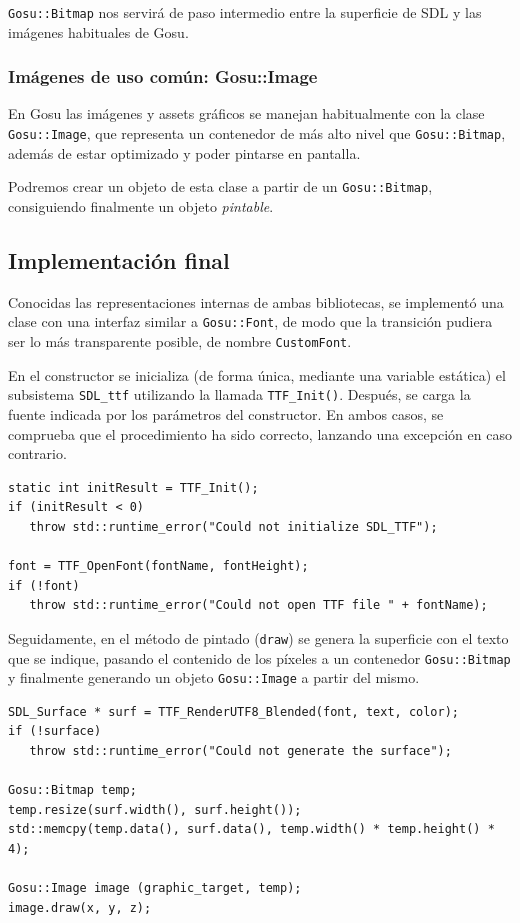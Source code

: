 \texttt{Gosu::Bitmap} nos servirá de paso intermedio entre la superficie de SDL y las
imágenes habituales de Gosu.

\subsubsection{Imágenes de uso común: Gosu::Image}
En Gosu las imágenes y assets gráficos se manejan habitualmente con la clase
\texttt{Gosu::Image}, que representa un contenedor de más alto nivel que
\texttt{Gosu::Bitmap}, además de estar optimizado y poder pintarse en pantalla.

Podremos crear un objeto de esta clase a partir de un \texttt{Gosu::Bitmap}, consiguiendo
finalmente un objeto \textit{pintable}.


\subsection{Implementación final}

Conocidas las representaciones internas de ambas bibliotecas, se implementó una
clase con una interfaz similar a \texttt{Gosu::Font}, de modo que la transición
pudiera ser lo más transparente posible, de nombre \texttt{CustomFont}.

En el constructor se inicializa (de forma única, mediante una variable estática)
el subsistema \texttt{SDL\_ttf} utilizando la llamada
\texttt{TTF\_Init()}. Después, se carga la fuente indicada por los parámetros
del constructor. En ambos casos, se comprueba que el procedimiento ha sido
correcto, lanzando una excepción en caso contrario.

\begin{verbatim}
static int initResult = TTF_Init();
if (initResult < 0)
   throw std::runtime_error("Could not initialize SDL_TTF");

font = TTF_OpenFont(fontName, fontHeight);
if (!font)
   throw std::runtime_error("Could not open TTF file " + fontName);

\end{verbatim}

Seguidamente, en el método de pintado (\texttt{draw}) se genera la superficie
con el texto que se indique, pasando el contenido de los píxeles a un contenedor
\texttt{Gosu::Bitmap} y finalmente generando un objeto \texttt{Gosu::Image} a
partir del mismo.

\begin{verbatim}
SDL_Surface * surf = TTF_RenderUTF8_Blended(font, text, color);
if (!surface)
   throw std::runtime_error("Could not generate the surface");

Gosu::Bitmap temp;
temp.resize(surf.width(), surf.height());
std::memcpy(temp.data(), surf.data(), temp.width() * temp.height() * 4);

Gosu::Image image (graphic_target, temp);
image.draw(x, y, z);
\end{verbatim}

